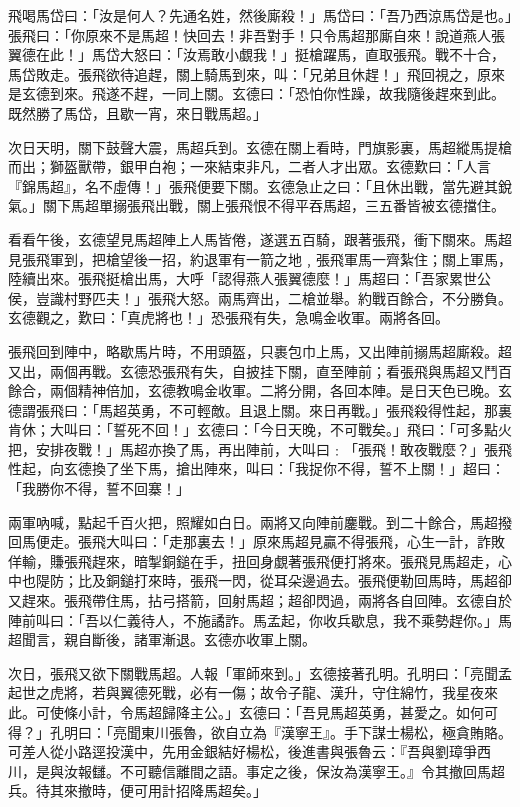 飛喝馬岱曰：「汝是何人？先通名姓，然後廝殺！」馬岱曰：「吾乃西涼馬岱是也。」張飛曰：「你原來不是馬超！快回去！非吾對手！只令馬超那廝自來！說道燕人張翼德在此！」馬岱大怒曰：「汝焉敢小覷我！」挺槍躍馬，直取張飛。戰不十合，馬岱敗走。張飛欲待追趕，關上騎馬到來，叫：「兄弟且休趕！」飛回視之，原來是玄德到來。飛遂不趕，一同上關。玄德曰：「恐怕你性躁，故我隨後趕來到此。既然勝了馬岱，且歇一宵，來日戰馬超。」

次日天明，關下鼓聲大震，馬超兵到。玄德在關上看時，門旗影裏，馬超縱馬提槍而出；獅盔獸帶，銀甲白袍；一來結束非凡，二者人才出眾。玄德歎曰：「人言『錦馬超』，名不虛傳！」張飛便要下關。玄德急止之曰：「且休出戰，當先避其銳氣。」關下馬超單搦張飛出戰，關上張飛恨不得平吞馬超，三五番皆被玄德擋住。

看看午後，玄德望見馬超陣上人馬皆倦，遂選五百騎，跟著張飛，衝下關來。馬超見張飛軍到，把槍望後一招，約退軍有一箭之地﹐張飛軍馬一齊紮住；關上軍馬，陸續出來。張飛挺槍出馬，大呼「認得燕人張翼德麼！」馬超曰：「吾家累世公侯，豈識村野匹夫！」張飛大怒。兩馬齊出，二槍並舉。約戰百餘合，不分勝負。玄德觀之，歎曰：「真虎將也！」恐張飛有失，急鳴金收軍。兩將各回。

張飛回到陣中，略歇馬片時，不用頭盔，只裹包巾上馬，又出陣前搦馬超廝殺。超又出，兩個再戰。玄德恐張飛有失，自披挂下關，直至陣前；看張飛與馬超又鬥百餘合，兩個精神倍加，玄德教鳴金收軍。二將分開，各回本陣。是日天色已晚。玄德謂張飛曰：「馬超英勇，不可輕敵。且退上關。來日再戰。」張飛殺得性起，那裏肯休；大叫曰：「誓死不回！」玄德曰：「今日天晚，不可戰矣。」飛曰：「可多點火把，安排夜戰！」馬超亦換了馬，再出陣前，大叫曰﹕「張飛！敢夜戰麼？」張飛性起，向玄德換了坐下馬，搶出陣來，叫曰：「我捉你不得，誓不上關！」超曰：「我勝你不得，誓不回寨！」

兩軍吶喊，點起千百火把，照耀如白日。兩將又向陣前鏖戰。到二十餘合，馬超撥回馬便走。張飛大叫曰：「走那裏去！」原來馬超見贏不得張飛，心生一計，詐敗佯輸，賺張飛趕來，暗掣銅鎚在手，扭回身覷著張飛便打將來。張飛見馬超走，心中也隄防；比及銅鎚打來時，張飛一閃，從耳朵邊過去。張飛便勒回馬時，馬超卻又趕來。張飛帶住馬，拈弓搭箭，回射馬超；超卻閃過，兩將各自回陣。玄德自於陣前叫曰：「吾以仁義待人，不施譎詐。馬孟起，你收兵歇息，我不乘勢趕你。」馬超聞言，親自斷後，諸軍漸退。玄德亦收軍上關。

次日，張飛又欲下關戰馬超。人報「軍師來到。」玄德接著孔明。孔明曰：「亮聞孟起世之虎將，若與翼德死戰，必有一傷；故令子龍、漢升，守住綿竹，我星夜來此。可使條小計，令馬超歸降主公。」玄德曰：「吾見馬超英勇，甚愛之。如何可得？」孔明曰：「亮聞東川張魯，欲自立為『漢寧王』。手下謀士楊松，極貪賄賂。可差人從小路逕投漢中，先用金銀結好楊松，後進書與張魯云：『吾與劉璋爭西川，是與汝報讎。不可聽信離間之語。事定之後，保汝為漢寧王。』令其撤回馬超兵。待其來撤時，便可用計招降馬超矣。」


